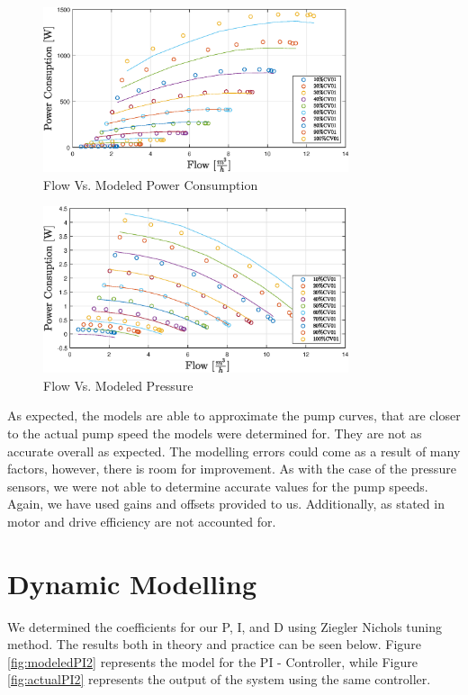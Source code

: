 \begin{figure}[ht]
	\centering
	\includegraphics[width=0.8\textwidth]{figures/06ModelValidation/flowVsModeledPowerConsumption.eps}
	\caption{Flow Vs. Modeled Power Consumption}
	\label{fig:flowVsModeledPower}
\end{figure}
\begin{figure}[ht]
	\centering
	\includegraphics[width=0.8\textwidth]{figures/06ModelValidation/flowVsModeledPressure.eps}
	\caption{Flow Vs. Modeled Pressure}
	\label{fig:flowVsModeledPressure}
\end{figure}

As expected, the models are able to approximate the pump curves, that are closer to the actual pump speed 
the models were determined for. They are not as accurate overall as expected. 
The modelling errors could come as a result of many factors, however, there is room for improvement. 
As with the case of the pressure sensors, we were not able to determine accurate values for 
the pump speeds. Again, we have used gains and offsets provided to us. Additionally, as stated in \cite{Yang2010}
motor and drive efficiency are not accounted for.

\section{Dynamic Modelling}
We determined the coefficients for our P, I, and D using Ziegler Nichols tuning method.
The results both in theory and practice can be seen below. Figure \ref{fig:modeledPI2} represents the model for the PI -
Controller, while Figure \ref{fig:actualPI2} represents the output of the system using the same controller.

